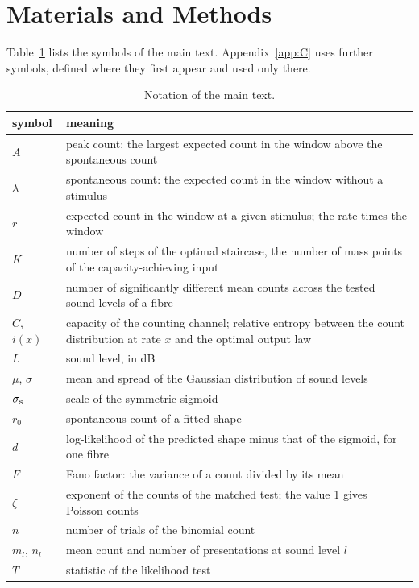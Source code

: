 
\section{Materials and Methods}\label{sec:methods}

Table~\ref{tab:notation} lists the symbols of the main text. Appendix~\ref{app:C} uses further symbols, defined where they first
appear and used only there.

\begin{table}[tp]
\caption{Notation of the main text.}\label{tab:notation}
\centering
\small
\begin{tabular}{>{\raggedright\arraybackslash}p{2.0cm}>{\raggedright\arraybackslash}p{11.0cm}}
\hline
symbol & meaning\\
\hline
$A$ & peak count: the largest expected count in the window above the spontaneous count\\
$\lambda$ & spontaneous count: the expected count in the window without a stimulus\\
$r$ & expected count in the window at a given stimulus; the rate times the window\\
$K$ & number of steps of the optimal staircase, the number of mass points of the capacity-achieving input\\
$D$ & number of significantly different mean counts across the tested sound levels of a fibre\\
$C$, $i(x)$ & capacity of the counting channel; relative entropy between the count distribution at rate $x$ and the optimal output law\\
$L$ & sound level, in dB\\
$\mu$, $\sigma$ & mean and spread of the Gaussian distribution of sound levels\\
$\sigma_{\rm s}$ & scale of the symmetric sigmoid\\
$r_0$ & spontaneous count of a fitted shape\\
$d$ & log-likelihood of the predicted shape minus that of the sigmoid, for one fibre\\
$F$ & Fano factor: the variance of a count divided by its mean\\
$\zeta$ & exponent of the counts of the matched test; the value 1 gives Poisson counts\\
$n$ & number of trials of the binomial count\\
$m_l$, $n_l$ & mean count and number of presentations at sound level $l$\\
$T$ & statistic of the likelihood test\\
\hline
\end{tabular}
\end{table}

